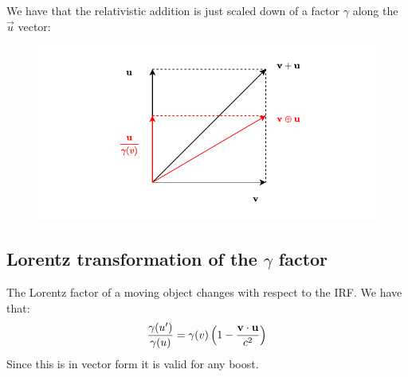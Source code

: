 We have that the relativistic addition is just scaled down of a factor $\gamma$ along the $\vec{u}$ vector:
\begin{figure}[H]
  \centering
  \includegraphics[width=0.8\linewidth]{res/svg/relativistic_addition.drawio}
\end{figure}
\subsection{Lorentz transformation of the $\gamma$ factor}
The Lorentz factor of a moving object changes with respect to the IRF. We have that:
\begin{equation}
  \dfrac{\gamma(u')}{\gamma(u)} = \gamma(v)\left(1-\dfrac{\vb{v}\cdot\vb{u}}{c^2}\right)
\end{equation}
Since this is in vector form it is valid for any boost.
